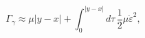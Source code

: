 \begin{equation}
\Gamma_\gamma \approx \mu |y-x| + \int_0^{|y-x|} d\tau\, \frac{1}{2}\mu \dot{\varepsilon}^2,
\label{gammaction}
\end{equation}

